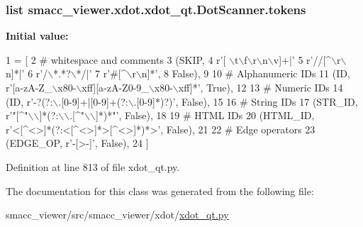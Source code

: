 \subsubsection[{\texorpdfstring{tokens}{tokens}}]{\setlength{\rightskip}{0pt plus 5cm}list smacc\+\_\+viewer.\+xdot.\+xdot\+\_\+qt.\+Dot\+Scanner.\+tokens\hspace{0.3cm}{\ttfamily [static]}}\hypertarget{classsmacc__viewer_1_1xdot_1_1xdot__qt_1_1DotScanner_af10963a2b918de10ad86dd02714873ce}{}\label{classsmacc__viewer_1_1xdot_1_1xdot__qt_1_1DotScanner_af10963a2b918de10ad86dd02714873ce}
{\bfseries Initial value\+:}
\begin{DoxyCode}
1 = [
2         \textcolor{comment}{# whitespace and comments}
3         (SKIP,
4             \textcolor{stringliteral}{r'[ \(\backslash\)t\(\backslash\)f\(\backslash\)r\(\backslash\)n\(\backslash\)v]+|'}
5             \textcolor{stringliteral}{r'//[^\(\backslash\)r\(\backslash\)n]*|'}
6             \textcolor{stringliteral}{r'/\(\backslash\)*.*?\(\backslash\)*/|'}
7             \textcolor{stringliteral}{r'#[^\(\backslash\)r\(\backslash\)n]*'},
8         \textcolor{keyword}{False}),
9 
10         \textcolor{comment}{# Alphanumeric IDs}
11         (ID, \textcolor{stringliteral}{r'[a-zA-Z\_\(\backslash\)x80-\(\backslash\)xff][a-zA-Z0-9\_\(\backslash\)x80-\(\backslash\)xff]*'}, \textcolor{keyword}{True}),
12 
13         \textcolor{comment}{# Numeric IDs}
14         (ID, \textcolor{stringliteral}{r'-?(?:\(\backslash\).[0-9]+|[0-9]+(?:\(\backslash\).[0-9]*)?)'}, \textcolor{keyword}{False}),
15 
16         \textcolor{comment}{# String IDs}
17         (STR\_ID, \textcolor{stringliteral}{r'"[^"\(\backslash\)\(\backslash\)]*(?:\(\backslash\)\(\backslash\).[^"\(\backslash\)\(\backslash\)]*)*"'}, \textcolor{keyword}{False}),
18 
19         \textcolor{comment}{# HTML IDs}
20         (HTML\_ID, \textcolor{stringliteral}{r'<[^<>]*(?:<[^<>]*>[^<>]*)*>'}, \textcolor{keyword}{False}),
21 
22         \textcolor{comment}{# Edge operators}
23         (EDGE\_OP, \textcolor{stringliteral}{r'-[>-]'}, \textcolor{keyword}{False}),
24     ]
\end{DoxyCode}


Definition at line 813 of file xdot\+\_\+qt.\+py.



The documentation for this class was generated from the following file\+:\begin{DoxyCompactItemize}
\item 
smacc\+\_\+viewer/src/smacc\+\_\+viewer/xdot/\hyperlink{xdot__qt_8py}{xdot\+\_\+qt.\+py}\end{DoxyCompactItemize}
